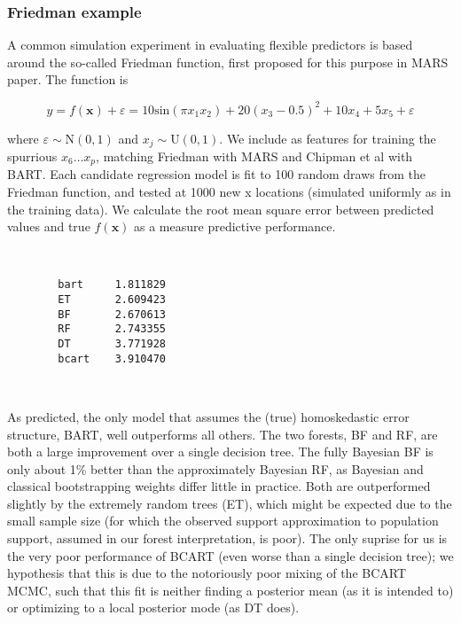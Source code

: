 \documentclass[12pt]{article}
\begin{document}
\subsubsection{Friedman example}\label{friedman-example}

A common simulation experiment in evaluating flexible predictors is
based around the so-called Friedman function, first proposed for this
purpose in \cite{friedman_multivariate_1991} MARS paper. The function is

\[
y = f(\mathbf{x}) +  \varepsilon = 10\mathrm{sin}(\pi x_1 x_2) + 20 (x_3-0.5)^2 + 10x_4 + 5x_5 + \varepsilon
\]

where $\varepsilon \sim \mathrm{N}(0,1)$ and $x_j \sim \mathrm{U}(0,1)$.
We include as features for training the spurrious $x_6 \dots x_{p}$,
matching Friedman with MARS and Chipman et al with BART. Each candidate
regression model is fit to 100 random draws from the Friedman function,
and tested at 1000 new x locations (simulated uniformly as in the
training data). We calculate the root mean square error between
predicted values and true $f(\mathbf{x})$ as a measure predictive
performance.

   
    \begin{center}
    \end{center}
    { \hspace*{\fill} \\}
    

    \begin{verbatim}
        bart     1.811829
        ET       2.609423
        BF       2.670613
        RF       2.743355
        DT       3.771928
        bcart    3.910470
\end{verbatim}
        
    \begin{center}
    \end{center}
    { \hspace*{\fill} \\}
    
    As predicted, the only model that assumes the (true) homoskedastic error
structure, BART, well outperforms all others. The two forests, BF and
RF, are both a large improvement over a single decision tree. The fully
Bayesian BF is only about 1\% better than the approximately Bayesian RF,
as Bayesian and classical bootstrapping weights differ little in
practice. Both are outperformed slightly by the extremely random trees
(ET), which might be expected due to the small sample size (for which
the observed support approximation to population support, assumed in our
forest interpretation, is poor). The only suprise for us is the very
poor performance of BCART (even worse than a single decision tree); we
hypothesis that this is due to the notoriously poor mixing of the BCART
MCMC, such that this fit is neither finding a posterior mean (as it is
intended to) or optimizing to a local posterior mode (as DT does).
\end{document}
